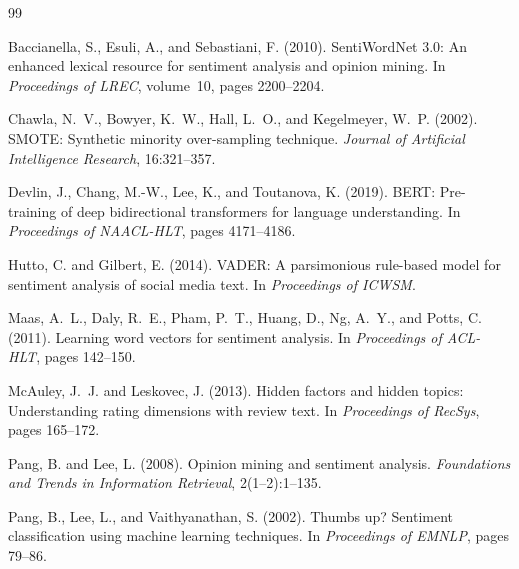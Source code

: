 \documentclass[11pt,a4paper]{article}
\begin{document}
\newpage

\begin{thebibliography}{99}

Baccianella, S., Esuli, A., and Sebastiani, F. (2010).
\newblock SentiWordNet 3.0: An enhanced lexical resource for sentiment analysis
  and opinion mining.
\newblock In \textit{Proceedings of LREC}, volume~10, pages 2200--2204.

Chawla, N.~V., Bowyer, K.~W., Hall, L.~O., and Kegelmeyer, W.~P. (2002).
\newblock SMOTE: Synthetic minority over-sampling technique.
\newblock \textit{Journal of Artificial Intelligence Research}, 16:321--357.

Devlin, J., Chang, M.-W., Lee, K., and Toutanova, K. (2019).
\newblock BERT: Pre-training of deep bidirectional transformers for language
  understanding.
\newblock In \textit{Proceedings of NAACL-HLT}, pages 4171--4186.

Hutto, C. and Gilbert, E. (2014).
\newblock VADER: A parsimonious rule-based model for sentiment analysis of
  social media text.
\newblock In \textit{Proceedings of ICWSM}.

Maas, A.~L., Daly, R.~E., Pham, P.~T., Huang, D., Ng, A.~Y., and Potts, C.
  (2011).
\newblock Learning word vectors for sentiment analysis.
\newblock In \textit{Proceedings of ACL-HLT}, pages 142--150.

McAuley, J.~J. and Leskovec, J. (2013).
\newblock Hidden factors and hidden topics: Understanding rating dimensions
  with review text.
\newblock In \textit{Proceedings of RecSys}, pages 165--172.

Pang, B. and Lee, L. (2008).
\newblock Opinion mining and sentiment analysis.
\newblock \textit{Foundations and Trends in Information Retrieval},
  2(1--2):1--135.

Pang, B., Lee, L., and Vaithyanathan, S. (2002).
\newblock Thumbs up? Sentiment classification using machine learning
  techniques.
\newblock In \textit{Proceedings of EMNLP}, pages 79--86.

\end{thebibliography}
\end{document}
